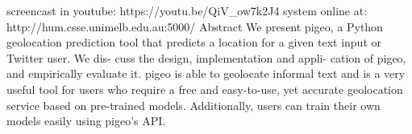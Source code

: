 screencast in youtube: https://youtu.be/QiV\_ow7k2J4 system online at: http://hum.csse.unimelb.edu.au:5000/ Abstract We present pigeo, a Python geolocation prediction tool that predicts a location for a given text input or Twitter user. We dis- cuss the design, implementation and appli- cation of pigeo, and empirically evaluate it. pigeo is able to geolocate informal text and is a very useful tool for users who require a free and easy-to-use, yet accurate geolocation service based on pre-trained models. Additionally, users can train their own models easily using pigeo's API.
